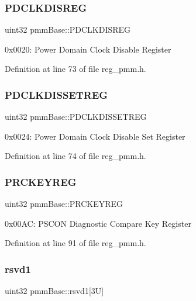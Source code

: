 \subsubsection{\texorpdfstring{P\+D\+C\+L\+K\+D\+I\+S\+R\+EG}{PDCLKDISREG}}
{\footnotesize\ttfamily uint32 pmm\+Base\+::\+P\+D\+C\+L\+K\+D\+I\+S\+R\+EG}

0x0020\+: Power Domain Clock Disable Register 

Definition at line 73 of file reg\+\_\+pmm.\+h.

\mbox{\label{structpmmBase_a3e4d3dbe34d3a86a6c7cb59c38a84754}} 
\subsubsection{\texorpdfstring{P\+D\+C\+L\+K\+D\+I\+S\+S\+E\+T\+R\+EG}{PDCLKDISSETREG}}
{\footnotesize\ttfamily uint32 pmm\+Base\+::\+P\+D\+C\+L\+K\+D\+I\+S\+S\+E\+T\+R\+EG}

0x0024\+: Power Domain Clock Disable Set Register 

Definition at line 74 of file reg\+\_\+pmm.\+h.

\mbox{\label{structpmmBase_a1ff077e7e04a89127edc4bfdf871d7a3}} 
\subsubsection{\texorpdfstring{P\+R\+C\+K\+E\+Y\+R\+EG}{PRCKEYREG}}
{\footnotesize\ttfamily uint32 pmm\+Base\+::\+P\+R\+C\+K\+E\+Y\+R\+EG}

0x00\+AC\+: P\+S\+C\+ON Diagnostic Compare Key Register 

Definition at line 91 of file reg\+\_\+pmm.\+h.

\mbox{\label{structpmmBase_a37781915b006e7a4907940b2f1c84ea1}} 
\subsubsection{\texorpdfstring{rsvd1}{rsvd1}}
{\footnotesize\ttfamily uint32 pmm\+Base\+::rsvd1\mbox{[}3\+U\mbox{]}}

